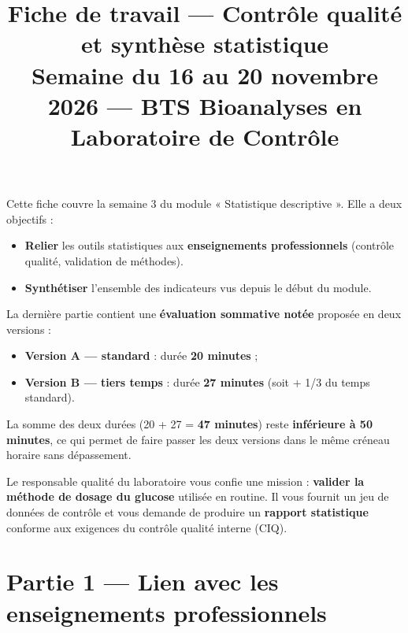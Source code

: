 \documentclass[11pt,a4paper]{article}
\title{\textcolor{primary}{\textbf{Fiche de travail — Contrôle qualité et synthèse statistique}}\\
\large Semaine du 16 au 20 novembre 2026 — BTS Bioanalyses en Laboratoire de Contrôle}
\author{}
\date{}
\begin{document}
\maketitle

\begin{consigne}
Cette fiche couvre la semaine 3 du module « Statistique descriptive ». Elle a deux objectifs :
\begin{itemize}[leftmargin=*]
    \item \textbf{Relier} les outils statistiques aux \textbf{enseignements professionnels} (contrôle qualité, validation de méthodes).
    \item \textbf{Synthétiser} l'ensemble des indicateurs vus depuis le début du module.
\end{itemize}

La dernière partie contient une \textbf{évaluation sommative notée} proposée en deux versions :
\begin{itemize}[leftmargin=*]
    \item \textbf{Version A — standard} : durée \textbf{20 minutes} ;
    \item \textbf{Version B — tiers temps} : durée \textbf{27 minutes} (soit + 1/3 du temps standard).
\end{itemize}
La somme des deux durées (20 + 27 = \textbf{47 minutes}) reste \textbf{inférieure à 50 minutes}, ce qui permet de faire passer les deux versions dans le même créneau horaire sans dépassement.
\end{consigne}

\vspace{0.3cm}

\begin{contexte}
Le responsable qualité du laboratoire vous confie une mission : \textbf{valider la méthode de dosage du glucose} utilisée en routine. Il vous fournit un jeu de données de contrôle et vous demande de produire un \textbf{rapport statistique} conforme aux exigences du contrôle qualité interne (CIQ).
\end{contexte}

\vspace{0.4cm}

\section*{Partie 1 — Lien avec les enseignements professionnels}
\end{document}
